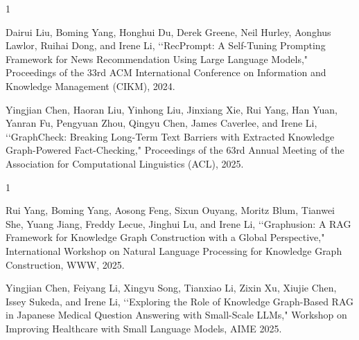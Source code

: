 \begin{査読付}{1}  %

Dairui Liu, Boming Yang, Honghui Du, Derek Greene, Neil Hurley, Aonghus Lawlor, Ruihai Dong, and Irene Li, \lq \lq RecPrompt: A Self-Tuning Prompting Framework for News Recommendation Using Large Language Models," Proceedings of the 33rd ACM International Conference on Information and Knowledge Management (CIKM), 2024.

Yingjian Chen, Haoran Liu, Yinhong Liu, Jinxiang Xie, Rui Yang, Han Yuan, Yanran Fu, Pengyuan Zhou, Qingyu Chen, James Caverlee, and Irene Li, \lq\lq GraphCheck: Breaking Long-Term Text Barriers with Extracted Knowledge Graph-Powered Fact-Checking," Proceedings of the 63rd Annual Meeting of the Association for Computational Linguistics (ACL), 2025.


\end{査読付}  %









\begin{発表}{1}  %

Rui Yang, Boming Yang, Aosong Feng, Sixun Ouyang, Moritz Blum, Tianwei She, Yuang Jiang, Freddy Lecue, Jinghui Lu, and Irene Li, \lq\lq Graphusion: A RAG Framework for Knowledge Graph Construction with a Global Perspective,"
International Workshop on Natural Language Processing for Knowledge Graph Construction, WWW, 2025. 

Yingjian Chen, Feiyang Li, Xingyu Song, Tianxiao Li, Zixin Xu, Xiujie Chen, Issey Sukeda, and Irene Li,
\lq\lq Exploring the Role of Knowledge Graph-Based RAG in Japanese Medical Question Answering with Small-Scale LLMs," Workshop on Improving Healthcare with Small Language Models, AIME 2025. 


\end{発表}  %


